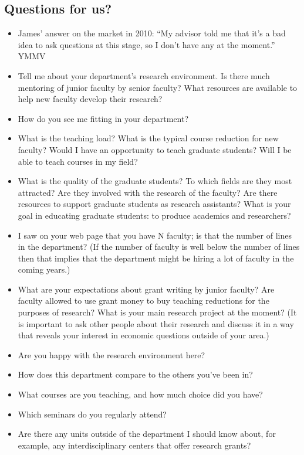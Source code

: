 \documentclass[12pt]{article}
\theoremstyle{plain}
\theoremstyle{plain}
\theoremstyle{plain}
\theoremstyle{plain}
\theoremstyle{plain}
\theoremstyle{plain}
\begin{document}
\subsection{Questions for us?}
\label{sec:org7810baf}
\begin{itemize}
\item James’ answer on the market in 2010: “My advisor told me that it’s a bad idea to ask questions at this stage, so I don’t have any at the moment.” YMMV
\item Tell me about your department’s research environment.
Is there much mentoring of junior faculty by senior faculty?
What resources are available to help new faculty develop their research?
\item How do you see me fitting in your department?
\item What is the teaching load? What is the typical course reduction for new faculty?
Would I have an opportunity to teach graduate students?
Will I be able to teach courses in my field?
\item What is the quality of the graduate students?
To which fields are they most attracted?
Are they involved with the research of the faculty?
Are there resources to support graduate students as research assistants?
What is your goal in educating graduate students: to produce academics and researchers?
\item I saw on your web page that you have N faculty; is that the number of lines in the department?
(If the number of faculty is well below the number of lines then that implies that the department might be hiring a lot of faculty in the coming years.)
\item What are your expectations about grant writing by junior faculty?
Are faculty allowed to use grant money to buy teaching reductions for the purposes of research? What is your main research project at the moment?
(It is important to ask other people about their research and discuss it in a way that reveals your interest in economic questions outside of your area.)
\item Are you happy with the research environment here?
\item How does this department compare to the others you’ve been in?
\item What courses are you teaching, and how much choice did you have?
\item Which seminars do you regularly attend?
\item Are there any units outside of the department I should know about, for example, any interdisciplinary centers that offer research grants?

\end{itemize}
\end{document}

